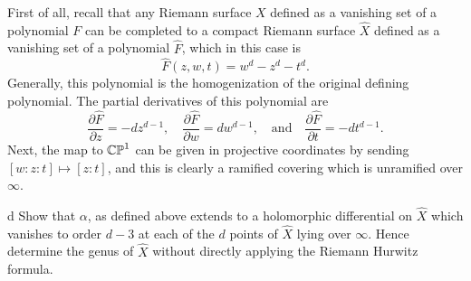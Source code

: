 \documentclass[expanded]{lkx_pset}
\begin{document}
\begin{parts}
	First of all, recall that any Riemann surface $X$ defined as a vanishing set of a polynomial $F$ can be completed to a compact Riemann surface $\widehat{X}$ defined as a vanishing set of a polynomial $\widehat{F}$, which in this case is
	\[
		\widehat{F}(z,w,t) = w^d - z^d -t^d.
	\]
	Generally, this polynomial is the homogenization of the original defining polynomial. The partial derivatives of this polynomial are
	\[
		\frac{\partial \widehat{F}}{\partial z} = - dz^{d-1},\quad\frac{\partial \widehat{F}}{\partial w} = dw^{d-1},\quad\textrm{and}\quad \frac{\partial \widehat{F}}{\partial t} = -dt^{d-1}.
	\]
	Next, the map to $\mathbb{CP}^1$ can be given in projective coordinates by sending $[w:z:t]\mapsto [z:t]$, and this is clearly a ramified covering which is unramified over $\infty$.

	\begin{part}{d}
		Show that $\alpha$, as defined above extends to a holomorphic differential on $\widehat{X}$ which vanishes to order $d-3$ at each of the $d$ points of $\widehat{X}$ lying over $\infty$. Hence determine the genus of $\widehat{X}$ without directly applying the Riemann Hurwitz formula.
	\end{part}
\end{parts}
\end{document}

